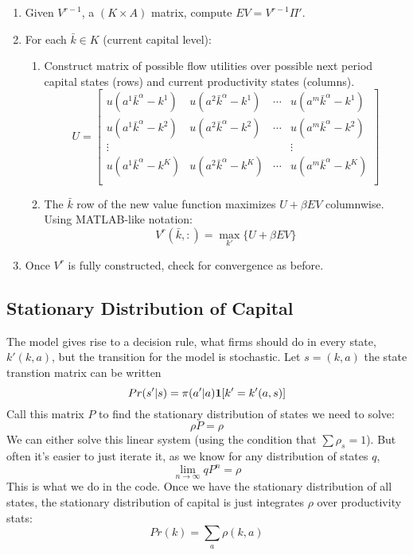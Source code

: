 \documentclass[twoside]{article}
\newcommand{\ind}[1]{{\bf 1  }[ #1 ] }
\begin{document}
\begin{enumerate}
\item Given $V^{r-1}$, a $(K \times A)$ matrix, compute $EV = V^{r-1}\Pi'$.  
\item For each $\bar{k} \in K$ (current capital level):
\begin{enumerate}
\item Construct matrix of possible flow utilities over possible next period capital states (rows) and current productivity states (columns). 
$$
U = \begin{bmatrix} u(a^1 \bar{k}^\alpha - k^1) &  u(a^2 \bar{k}^\alpha - k^1) & \cdots & u(a^m \bar{k}^\alpha - k^1) \\
u(a^1 \bar{k}^\alpha - k^2) &  u(a^2 \bar{k}^\alpha - k^2) & \cdots & u(a^m \bar{k}^\alpha - k^2) \\
\vdots & & & \vdots \\
u(a^1 \bar{k}^\alpha - k^K) &  u(a^2 \bar{k}^\alpha - k^K) & \cdots & u(a^m \bar{k}^\alpha - k^K) \\
\end{bmatrix} $$
\item The $\bar{k}$ row of the new value function maximizes $U + \beta EV$ columnwise. Using MATLAB-like notation: 
$$V^r(\bar{k},:) = \max_{k'} \{ U + \beta EV \}$$ 
\end{enumerate}
\item Once $V^r$ is fully constructed, check for convergence as before. 
\end{enumerate}
 
\subsection{Stationary Distribution of Capital}

The model gives rise to a decision rule, what firms should do in every state, $k'(k, a)$, but the transition for the model is stochastic. Let $s = (k,a)$
the state transtion matrix can be written
$$Pr(s' | s) = \pi(a' | a) \ind{k' = k'(a,s)}$$
Call this matrix $P$ to find the stationary distribution of states we need to solve: 
$$\rho P = \rho$$
We can either solve this linear system (using the condition that $\sum \rho_s = 1$). But often it's easier to just iterate it, as we know for any distribution of states $q$,
$$\lim_{n \rightarrow \infty} qP^n = \rho $$ 
This is what we do in the code. 
Once we have the stationary distribution of all states, the stationary distribution of capital is just integrates $\rho$ over productivity stats: 
$$Pr(k) = \sum_{a} \rho(k,a)$$
\end{document}

